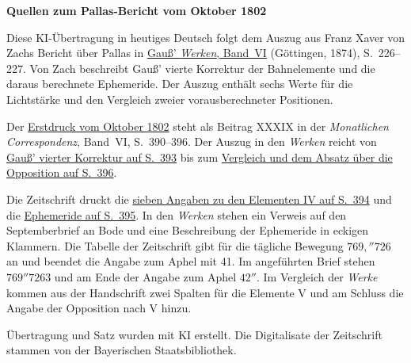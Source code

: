 \clearpage\thispagestyle{empty}
\begin{center}\textbf{Quellen zum Pallas-Bericht vom Oktober 1802}\end{center}
\noindent Diese KI-Übertragung in heutiges Deutsch folgt dem Auszug aus Franz Xaver von Zachs Bericht über Pallas in \href{https://gdz.sub.uni-goettingen.de/id/PPN236007467}{Gauß’ \textit{Werken}, Band~VI} (Göttingen, 1874), S.~226--227. Von Zach beschreibt Gauß’ vierte Korrektur der Bahnelemente und die daraus berechnete Ephemeride. Der Auszug enthält sechs Werte für die Lichtstärke und den Vergleich zweier vorausberechneter Positionen.
\par\smallskip\noindent Der \href{https://api.digitale-sammlungen.de/iiif/image/v2/bsb10538598_00400/full/1450,/0/default.jpg}{Erstdruck vom Oktober 1802} steht als Beitrag XXXIX in der \textit{Monatlichen Correspondenz}, Band~VI, S.~390--396. Der Auszug in den \textit{Werken} reicht von \href{https://api.digitale-sammlungen.de/iiif/image/v2/bsb10538598_00403/full/1450,/0/default.jpg}{Gauß’ vierter Korrektur auf S.~393} bis zum \href{https://api.digitale-sammlungen.de/iiif/image/v2/bsb10538598_00406/full/1450,/0/default.jpg}{Vergleich und dem Absatz über die Opposition auf S.~396}.
\par\smallskip\noindent Die Zeitschrift druckt die \href{https://api.digitale-sammlungen.de/iiif/image/v2/bsb10538598_00404/full/1450,/0/default.jpg}{sieben Angaben zu den Elementen IV auf S.~394} und die \href{https://api.digitale-sammlungen.de/iiif/image/v2/bsb10538598_00405/full/1450,/0/default.jpg}{Ephemeride auf S.~395}. In den \textit{Werken} stehen ein Verweis auf den Septemberbrief an Bode und eine Beschreibung der Ephemeride in eckigen Klammern. Die Tabelle der Zeitschrift gibt für die tägliche Bewegung \(769{,}''726\) an und beendet die Angabe zum Aphel mit 41. Im angeführten Brief stehen \(769''7263\) und am Ende der Angabe zum Aphel \(42''\). Im Vergleich der \textit{Werke} kommen aus der Handschrift zwei Spalten für die Elemente V und am Schluss die Angabe der Opposition nach V hinzu.
\par\smallskip\noindent Übertragung und Satz wurden mit KI erstellt. Die Digitalisate der Zeitschrift stammen von der Bayerischen Staatsbibliothek.
\clearpage
